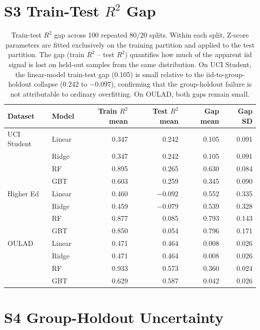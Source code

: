 \documentclass[10pt,letterpaper]{article}
\begin{document}
\clearpage
\section*{S3 Train-Test $R^2$ Gap}

\begin{table}[!h]
\centering
\caption{Train-test $R^2$ gap across 100 repeated 80/20 splits. Within each split, Z-score parameters are fitted exclusively on the training partition and applied to the test partition. The gap (train $R^2$ -- test $R^2$) quantifies how much of the apparent iid signal is lost on held-out samples from the same distribution. On UCI Student, the linear-model train-test gap (0.105) is small relative to the iid-to-group-holdout collapse (0.242 to $-0.097$), confirming that the group-holdout failure is not attributable to ordinary overfitting. On OULAD, both gaps remain small.}
\label{tab:train_test_gap}
\small
\begin{tabular}{l l r r r r}
\toprule
Dataset & Model & Train $R^2$ mean & Test $R^2$ mean & Gap mean & Gap SD \\
\midrule
UCI Student & Linear & 0.347 & 0.242 & 0.105 & 0.091 \\
 & Ridge & 0.347 & 0.242 & 0.105 & 0.091 \\
 & RF & 0.895 & 0.265 & 0.630 & 0.084 \\
 & GBT & 0.603 & 0.259 & 0.345 & 0.090 \\
\midrule
Higher Ed & Linear & 0.460 & $-0.092$ & 0.552 & 0.335 \\
 & Ridge & 0.459 & $-0.079$ & 0.539 & 0.328 \\
 & RF & 0.877 & 0.085 & 0.793 & 0.143 \\
 & GBT & 0.850 & 0.054 & 0.796 & 0.171 \\
\midrule
OULAD & Linear & 0.471 & 0.464 & 0.008 & 0.026 \\
 & Ridge & 0.471 & 0.464 & 0.008 & 0.026 \\
 & RF & 0.933 & 0.573 & 0.360 & 0.024 \\
 & GBT & 0.629 & 0.587 & 0.042 & 0.026 \\
\bottomrule
\end{tabular}
\end{table}

\clearpage
\section*{S4 Group-Holdout Uncertainty}
\end{document}
